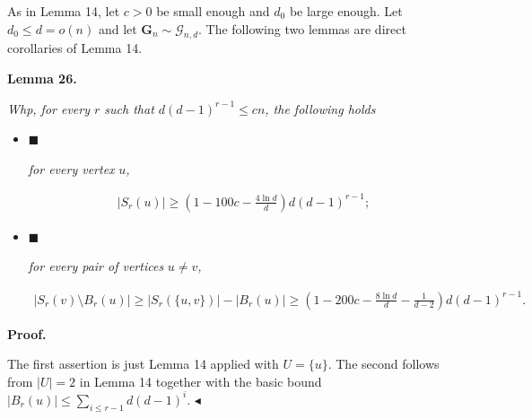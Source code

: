 As in Lemma 14, let $c>0$ be small enough and $d_{0}$ be large enough. Let $d_{0}\leq d=o(n)$ and let $\mathbf{G}_{n}\sim\mathcal{G}_{n,d}$. The following two lemmas are direct corollaries of Lemma 14.\par





\par\medskip\noindent\textbf{
\textbf{Lemma 26}\textbf{.}
}\par



\emph{Whp, for every $r$ such that $d(d-1)^{r-1}\leq cn$, the following holds}\par


\begin{itemize}


\item[] 
$\blacksquare$ 


\emph{for every vertex }$u$\emph{,}\par


\[\begin{gathered}
|S_{r}(u)|\geq\left(1-100c-\frac{4\ln d}{d}\right)d(d-1)^{r-1};
\end{gathered}\]





\item[] 
$\blacksquare$ 


\emph{for every pair of vertices }$u\neq v$\emph{,}\par


\[\begin{gathered}
|S_{r}(v)\setminus B_{r}(u)|\geq|S_{r}(\{u,v\})|-|B_{r}(u)|\geq\left(1-200c-\frac{8\ln d}{d}-\frac{1}{d-2}\right)d(d-1)^{r-1}.
\end{gathered}\]





\end{itemize}






\par\medskip\noindent\textbf{Proof.}\par




The first assertion is just Lemma 14 applied with $U=\{u\}$. The second follows from $|U|=2$ in Lemma 14 together with the basic bound $|B_{r}(u)|\leq\sum_{i\leq r-1}d(d-1)^{i}$.
$\blacktriangleleft$\par



